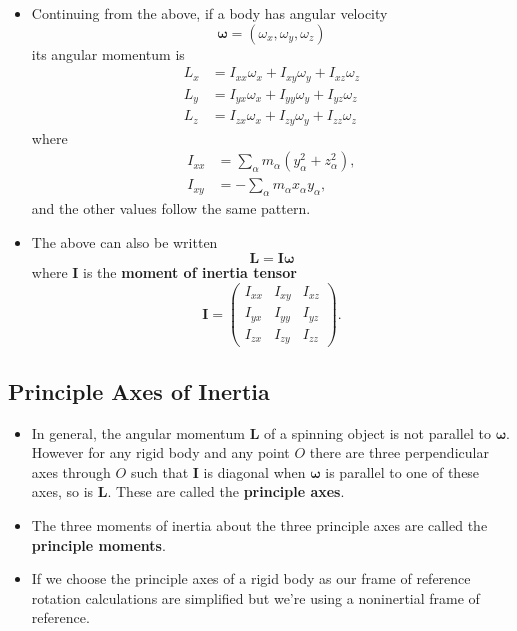 \documentclass{article}
\renewcommand{\vec}[1]{\boldsymbol{\mathbf{#1}}}
\begin{document}
\begin{itemize}
  \item Continuing from the above, if a body has angular velocity \[\vec{\omega} = (\omega_x, \omega_y, \omega_z)\] its angular momentum is \begin{align*}
          L_x & = I_{x x} \omega_x + I_{x y} \omega_y + I_{x z} \omega_z \\
          L_y & = I_{y x} \omega_x + I_{y y} \omega_y + I_{y z} \omega_z \\
          L_z & = I_{z x} \omega_x + I_{z y} \omega_y + I_{z z} \omega_z
        \end{align*} where \begin{align*}
          I_{x x} & = \sum_\alpha m_\alpha (y_\alpha^2 + z_\alpha^2), \\
          I_{x y} & = -\sum_\alpha m_\alpha x_\alpha y_\alpha,
        \end{align*} and the other values follow the same pattern.

  \item The above can also be written \[\vec{L} = \vec{I} \vec{\omega}\] where $\vec{I}$ is the \textbf{moment of inertia tensor} \[\vec{I} = \begin{pmatrix}
            I_{x x} & I_{x y} & I_{x z} \\
            I_{y x} & I_{y y} & I_{y z} \\
            I_{z x} & I_{z y} & I_{z z}
          \end{pmatrix}.\]
\end{itemize}

\subsection{Principle Axes of Inertia}

\begin{itemize}
  \item In general, the angular momentum $\vec{L}$ of a spinning object is not parallel to $\vec{\omega}$. However for any rigid body and any point $O$ there are three perpendicular axes through $O$ such that $\vec{I}$ is diagonal when $\vec{\omega}$ is parallel to one of these axes, so is $\vec{L}$. These are called the \textbf{principle axes}.

  \item The three moments of inertia about the three principle axes are called the \textbf{principle moments}.

  \item If we choose the principle axes of a rigid body as our frame of reference rotation calculations are simplified but we're using a noninertial frame of reference.
\end{itemize}
\end{document}
